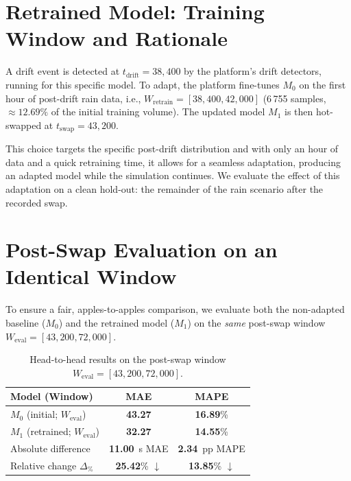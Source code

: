 \section{Retrained Model: Training Window and Rationale}

A drift event is detected at $t_{\text{drift}}=38{,}400$ by the platform's drift detectors, running for this specific model.
To adapt, the platform fine-tunes $M_0$ on the first hour of post-drift rain data, i.e., $W_{\text{retrain}}=[38{,}400, 42{,}000]$ (6\,755 samples, $\approx12.69\%$ of the initial training volume).
The updated model $M_1$ is then hot-swapped at $t_{\text{swap}}=43{,}200$.

This choice targets the specific post-drift distribution and with only an hour of data and a quick retraining time, it allows for a seamless adaptation, producing an adapted model while the simulation continues.
We evaluate the effect of this adaptation on a clean hold-out: the remainder of the rain scenario after the recorded swap.

\section{Post-Swap Evaluation on an Identical Window}

To ensure a fair, apples-to-apples comparison, we evaluate both the non-adapted baseline ($M_0$) and the retrained model ($M_1$) on the \emph{same} post-swap window $W_{\text{eval}}=[43{,}200, 72{,}000]$.

\begin{table}[h]
    \centering
    \caption{Head-to-head results on the post-swap window $W_{\text{eval}}=[43{,}200, 72{,}000]$.}
    \label{tab:postswap}
    \begin{tabular}{lcc}
        \toprule
        Model (Window) & MAE & MAPE \\
        \midrule
        $M_0$ (initial; $W_{\text{eval}}$) & \textbf{43.27} & \textbf{16.89}\% \\
        $M_1$ (retrained; $W_{\text{eval}}$) & \textbf{32.27} & \textbf{14.55}\% \\
        \midrule
        Absolute difference & \textbf{11.00}~s MAE & \textbf{2.34}~pp MAPE \\
        Relative change $\Delta_{\%}$ & \textbf{25.42}\% $\downarrow$ & \textbf{13.85}\% $\downarrow$ \\
        \bottomrule
    \end{tabular}
\end{table}

